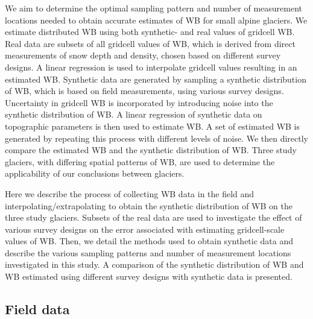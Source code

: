\documentclass[twocolumn,letterpaper]{igs}
\begin{document}
We aim to determine the optimal sampling pattern and number of measurement locations needed to obtain accurate estimates of WB for small alpine glaciers. We estimate distributed WB using both synthetic- and real values of gridcell WB. Real data are subsets of all gridcell values of WB, which is derived from direct measurements of snow depth and density, chosen based on different survey designs. A linear regression is used to interpolate gridcell values resulting in an estimated WB. Synthetic data are generated by sampling a synthetic distribution of WB, which is based on field measurements, using various survey designs. Uncertainty in gridcell WB is incorporated by introducing noise into the synthetic distribution of WB. A linear regression of synthetic data on topographic parameters is then used to estimate WB. A set of estimated WB is generated by repeating this process with different levels of noise. We then directly compare the estimated WB and the synthetic distribution of WB. Three study glaciers, with differing spatial patterns of WB, are used to determine the applicability of our conclusions between glaciers. 

Here we describe the process of collecting WB data in the field and interpolating/extrapolating to obtain the synthetic distribution of WB on the three study glaciers. Subsets of the real data are used to investigate the effect of various survey designs on the error associated with estimating gridcell-scale values of WB. Then, we detail the methods used to obtain synthetic data and describe the various sampling patterns and number of measurement locations investigated in this study. A comparison of the synthetic distribution of WB and WB estimated using different survey designs with synthetic data is presented. 

\subsection{Field data}
\end{document}
